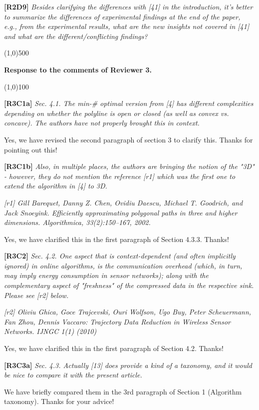 \documentclass{letter}
\begin{document}
\textbf{[R2D9]} \emph{Besides clarifying the differences with [41] in the introduction, it’s better to summarize the differences of experimental findings at the end of the paper, e.g., from the experimental results, what are the new insights not covered in [41] and what are the different/conflicting findings?}

\line(1,0){500}

\textbf{Response to the comments of Reviewer 3.}

\line(1,0){100}

\textbf{[R3C1a]} \emph{
Sec. 4.1. The min-\# optimal version from [4] has different complexities depending on whether the polyline is open or closed (as well as convex vs. concave). The authors have not properly brought this in context.}

Yes, we have revised the second paragraph of section 3 to clarify this. Thanks for pointing out this!

\textbf{[R3C1b]} \emph{Also, in multiple places, the authors are bringing the notion of the "3D" - however, they do not mention the reference [r1] which was the first one to extend the algorithm in [4] to 3D. }

\emph{[r1] Gill Barequet, Danny Z. Chen, Ovidiu Daescu, Michael T. Goodrich, and Jack Snoeyink. Efficiently approximating polygonal paths in three and higher dimensions. Algorithmica, 33(2):150–167, 2002.}

Yes, we have clarified this in the first paragraph of Section 4.3.3. Thanks!

\textbf{[R3C2]} \emph{
Sec. 4.2. One aspect that is context-dependent (and often implicitly ignored) in online algorithms, is the communication overhead (which, in turn, may imply energy consumption in sensor networks); along with the complementary aspect of "freshness" of the compressed data in the respective sink. Please see [r2] below.}

\emph{[r2] Oliviu Ghica, Goce Trajcevski, Ouri Wolfson, Ugo Buy, Peter Scheuermann, Fan Zhou, Dennis Vaccaro: Trajectory Data Reduction in Wireless Sensor Networks. IJNGC 1(1) (2010)
}

Yes, we have clarified this in the first paragraph of Section 4.2. Thanks!

\textbf{[R3C3a]} \emph{
Sec. 4.3. Actually [13] does provide a kind of a taxonomy, and it would be nice to compare it with the present article. }

We have briefly compared them in the 3rd paragraph of Section 1 (Algorithm taxonomy). Thanks for your advice!
\end{document}
